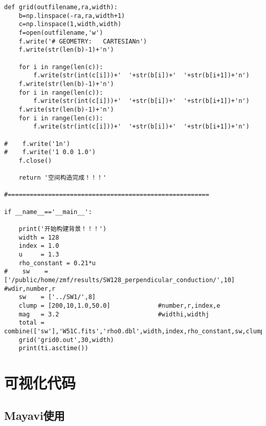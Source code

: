 \begin{lstlisting}
def grid(outfilename,ra,width):
    b=np.linspace(-ra,ra,width+1)
    c=np.linspace(1,width,width)
    f=open(outfilename,'w')
    f.write('# GEOMETRY:   CARTESIANn')
    f.write(str(len(b)-1)+'n')

    for i in range(len(c)):
        f.write(str(int(c[i]))+'  '+str(b[i])+'  '+str(b[i+1])+'n')
    f.write(str(len(b)-1)+'n')
    for i in range(len(c)):
        f.write(str(int(c[i]))+'  '+str(b[i])+'  '+str(b[i+1])+'n')
    f.write(str(len(b)-1)+'n')
    for i in range(len(c)):
        f.write(str(int(c[i]))+'  '+str(b[i])+'  '+str(b[i+1])+'n')

#    f.write('1n')
#    f.write('1 0.0 1.0')
    f.close()

    return '空间构造完成！！！'

#=======================================================

if __name__=='__main__':

    print('开始构建背景！！！')
    width = 128
    index = 1.0
    u     = 1.3
    rho_constant = 0.21*u
#    sw    = ['/public/home/zmf/results/SW128_perpendicular_conduction/',10]    #wdir,number,r
    sw    = ['../SW1/',8]
    clump = [200,10,1.0,50.0]             #number,r,index,e
    mag   = 3.2                           #widthi,widthj
    total = combine(['sw'],'W51C.fits','rho0.dbl',width,index,rho_constant,sw,clump,mag)
    grid('grid0.out',30,width)
    print(ti.asctime())

  \end{lstlisting}



\chapter{可视化代码}
\label{Further}

\section{Mayavi使用}
\label{Mayavi}

